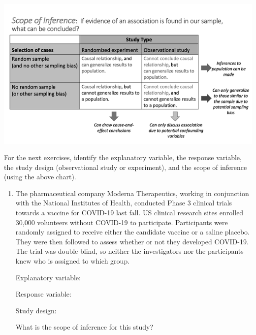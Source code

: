 \documentclass[
]{report}
\begin{document}
\begin{center}\includegraphics[width=0.75\linewidth]{images/ScopeOfInferenceGreyscale} \end{center}

For the next exercises, identify the explanatory variable, the response variable, the study design (observational study or experiment), and the scope of inference (using the above chart).

\begin{enumerate}
\def\labelenumi{\arabic{enumi}.}
\setcounter{enumi}{4}
\item
  The pharmaceutical company Moderna Therapeutics, working in conjunction with the National Institutes of Health, conducted Phase 3 clinical trials towards a vaccine for COVID-19 last fall. US clinical research sites enrolled 30,000 volunteers without COVID-19 to participate. Participants were randomly assigned to receive either the candidate vaccine or a saline placebo. They were then followed to assess whether or not they developed COVID-19. The trial was double-blind, so neither the investigators nor the participants knew who is assigned to which group.
  \vspace{0.1in}

  Explanatory variable:
  \vspace{0.25in}

  Response variable:
  \vspace{0.25in}

  Study design:
  \vspace{0.25in}

  What is the scope of inference for this study?
  \vspace{0.5in}
\end{enumerate}

\newpage
\end{document}
